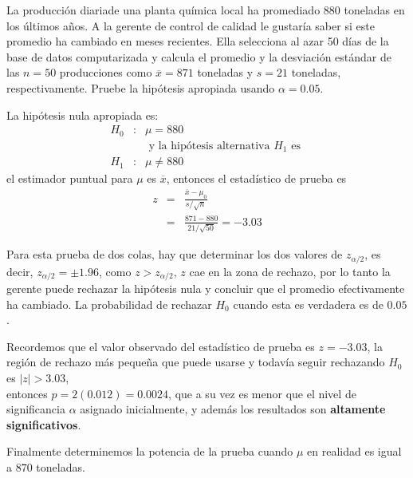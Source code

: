 \begin{Ejem}
La producci\'on diariade una planta qu\'imica local ha promediado 880 toneladas en los \'ultimos a\~nos. A la gerente de control de calidad le gustar\'ia saber si este promedio ha cambiado en meses recientes. Ella selecciona al azar 50 d\'ias de la base de datos computarizada y calcula el promedio y la desviaci\'on est\'andar de las $n=50$  producciones como $\overline{x}=871$ toneladas y $s=21$ toneladas, respectivamente. Pruebe la hip\'otesis  apropiada usando $\alpha=0.05$.

La hip\'otesis nula apropiada es:
\begin{eqnarray*}
H_{0}&:& \mu=880\\
&&\textrm{ y la hip\'otesis alternativa }H_{1}\textrm{ es }\\
H_{1}&:& \mu\neq880
\end{eqnarray*}
el estimador puntual para $\mu$ es $\overline{x}$, entonces el estad\'istico de prueba es\medskip
\begin{eqnarray*}
z&=&\frac{\overline{x}-\mu_{0}}{s/\sqrt{n}}\\
&=&\frac{871-880}{21/\sqrt{50}}=-3.03
\end{eqnarray*}

Para esta prueba de  dos colas, hay que determinar los dos valores de $z_{\alpha/2}$, es decir,  $z_{\alpha/2}=\pm1.96$, como $z>z_{\alpha/2}$, $z$ cae en la zona de rechazo, por lo tanto  la gerente puede rechazar la hip\'otesis nula y concluir que el promedio efectivamente ha cambiado.\medskip
La probabilidad de rechazar $H_{0}$ cuando esta es verdadera es de  $0.05$.

Recordemos que el valor observado del estad\'istico de prueba es $z=-3.03$, la regi\'on de rechazo m\'as peque\~na que puede usarse y todav\'ia seguir rechazando $H_{0}$ es $|z|>3.03$, \\
entonces $p=2(0.012)=0.0024$, que a su vez es menor que el nivel de significancia $\alpha$ asignado inicialmente, y adem\'as los resultados son  \textbf{altamente significativos}.

Finalmente determinemos la potencia de la prueba cuando $\mu$ en realidad es igual a $870$ toneladas.


\end{Ejem}
